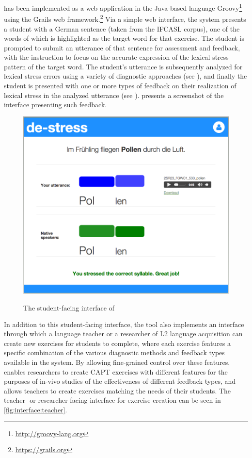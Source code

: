  has been 
implemented as a web application in the Java-based language Groovy\footnote{\url{http://groovy-lang.org}} using the Grails web framework.\footnote{\url{https://grails.org}} Via a simple web interface, the system presents a student with a German sentence (taken from the IFCASL corpus), one of the words of which is highlighted as the target word for that exercise. The student is prompted to submit an utterance of that sentence for assessment and feedback, with the instruction to focus on the accurate expression of the lexical stress pattern of the target word. The student's utterance is subsequently analyzed for lexical stress errors using a variety of diagnostic approaches (see ), and finally the student is presented with one or more types of feedback on their realization of lexical stress in the analyzed utterance (see ).  presents a screenshot of the interface presenting such feedback.

	\begin{figure}
		\centering
		\caption{The student-facing interface of }
		\includegraphics[width=.9\textwidth]{img/screenshots/StudentInterface-userIcon}
		\label{fig:interface:student}
	\end{figure}

In addition to this student-facing interface, the tool also implements an interface through which a language teacher or a researcher of L2 language acquisition can create new exercises for students to complete, where each exercise features a specific combination of the various diagnostic methods and feedback types available in the system. By allowing fine-grained control over these features,  enables researchers to create CAPT exercises with different features for the purposes of in-vivo studies of the effectiveness of different feedback types, and allows teachers to create exercises matching the needs of their students. The teacher- or researcher-facing interface for exercise creation can be seen in \cref{fig:interface:teacher}.

